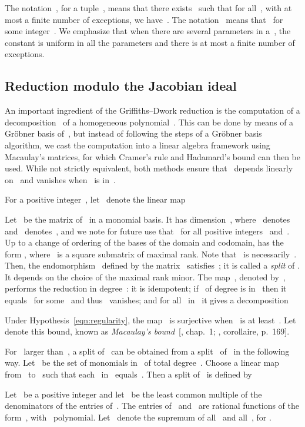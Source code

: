 \documentclass{sig-alternate}
\begin{document}
The notation~, for a tuple~, means that there exists~ such that for all~, with at most a finite number of exceptions, we have~.
The notation~ means that~ for some integer~.
We emphasize that when there are several parameters in a~, the constant is uniform in all the parameters and there is at most a finite number of exceptions.


\subsection{Reduction modulo the Jacobian ideal}
\label{sec:red-mod-jac}

\noindent An important ingredient of the Griffiths--Dwork reduction is the computation of a
decomposition~ of a homogeneous polynomial~.  This
can be done by means of a Gröbner basis of~, but instead of following
the steps of a Gr\"obner basis algorithm, we cast the computation into a linear
algebra framework using Macaulay's matrices, for which Cramer's rule and
Hadamard's bound can then be used.
While not strictly equivalent, both methods ensure that~ depends linearly on~ and vanishes when~ is in~.

For a positive integer~, let~ denote the linear map

Let~ be the matrix of~ in a monomial basis.
It has dimension~, where~ denotes~ and~ denotes~,
and we note for future use that~ for all positive integers~ and~.
Up to a change of ordering of the bases of the domain and codomain,  has the form ,
where~ is a  square submatrix of maximal rank.
Note that~ is necessarily~.
Then, the endomorphism~ defined by the matrix~
satisfies~; it is called a \emph{split} of .
It depends on the choice of the maximal rank minor.
The map~, denoted by~, performs the reduction in degree~: it is idempotent;
if~ of degree  is in~ then it equals~ for some~ and thus~ vanishes;
and for all~ in~ it gives a decomposition




Under Hypothesis~\eqref{eqn:regularity}, the map~ is surjective when~ is at least~.
Let~ denote this bound, known as \emph{Macaulay's bound}~[, chap.~1; , corollaire, p.~169]. 

For~ larger than~, a split of~ can be obtained from a split~ of~ in the following way.
Let~ be the set of monomials in~ of total degree~.
Choose a linear map  from~ to~ such that each~ in~ equals~.
Then a split of~ is defined by




Let~ be a positive integer and let~ be the least common multiple of the denominators of the entries of~.
The entries of~ and~ are rational functions of the form~, with~ polynomial.
Let~ denote the supremum of all~ and all~, for .
\end{document}

